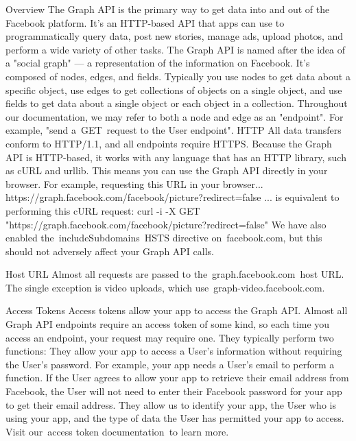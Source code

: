 Overview
The Graph API is the primary way to get data into and out of the Facebook platform. It's an HTTP-based API that apps can use to programmatically query data, post new stories, manage ads, upload photos, and perform a wide variety of other tasks.
The Graph API is named after the idea of a "social graph" — a representation of the information on Facebook. It's composed of nodes, edges, and fields. Typically you use nodes to get data about a specific object, use edges to get collections of objects on a single object, and use fields to get data about a single object or each object in a collection. Throughout our documentation, we may refer to both a node and edge as an "endpoint". For example, "send a GET request to the User endpoint".
HTTP
All data transfers conform to HTTP/1.1, and all endpoints require HTTPS. Because the Graph API is HTTP-based, it works with any language that has an HTTP library, such as cURL and urllib. This means you can use the Graph API directly in your browser. For example, requesting this URL in your browser...
https://graph.facebook.com/facebook/picture?redirect=false
... is equivalent to performing this cURL request:
curl -i -X GET "https://graph.facebook.com/facebook/picture?redirect=false"
We have also enabled the includeSubdomains HSTS directive on facebook.com, but this should not adversely affect your Graph API calls.

Host URL
Almost all requests are passed to the graph.facebook.com host URL. The single exception is video uploads, which use graph-video.facebook.com.

Access Tokens
Access tokens allow your app to access the Graph API. Almost all Graph API endpoints require an access token of some kind, so each time you access an endpoint, your request may require one. They typically perform two functions:
		They allow your app to access a User's information without requiring the User's password. For example, your app needs a User's email to perform a function. If the User agrees to allow your app to retrieve their email address from Facebook, the User will not need to enter their Facebook password for your app to get their email address.
		They allow us to identify your app, the User who is using your app, and the type of data the User has permitted your app to access.
Visit our access token documentation to learn more.


